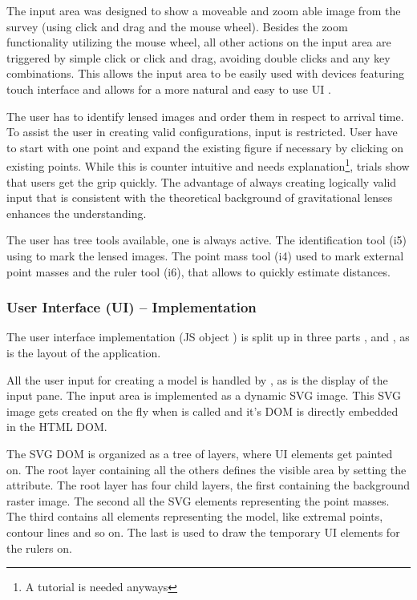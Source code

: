 The input area was designed to show a moveable and zoom able image from the survey (using click and drag and the mouse wheel).
Besides the zoom functionality utilizing the mouse wheel, all other actions on the input area are triggered by simple click or click and drag, avoiding double clicks and any key combinations.
This allows the input area to be easily used with devices featuring touch interface and allows for a more natural and easy to use UI \cite{ui-ms, ui-mac}.

The user has to identify lensed images and order them in respect to arrival time.
To assist the user in creating valid configurations, input is restricted.
User have to start with one point and expand the existing figure if necessary by clicking on existing points.
While this is counter intuitive and needs explanation\footnote{A tutorial is needed anyways}, trials show that users get the grip quickly.
The advantage of always creating logically valid input that is consistent with the theoretical background of gravitational lenses enhances the understanding.

The user has tree tools available, one is always active.
The identification tool (i5) using to mark the lensed images.
The point mass tool (i4) used to mark external point masses and the ruler tool (i6), that allows to quickly estimate distances.



\subsubsection{User Interface (UI) -- Implementation}
\label{sec:ui-impl}

The user interface implementation (JS object ) is split up in three parts ,  and , as is the layout of the application.

All the user input for creating a model is handled by , as is the display of the input pane.
The input area is implemented as a dynamic SVG image. This SVG image gets created on the fly when  is called and it's DOM is directly embedded in the HTML DOM.

The SVG DOM is organized as a tree of layers, where UI elements get painted on.
The root layer containing all the others defines the visible area by setting the  attribute.
The root layer has four child layers, the first containing the background raster image.
The second all the SVG elements representing the point masses.
The third contains all elements representing the model, like extremal points, contour lines and so on.
The last is used to draw the temporary UI elements for the rulers on.

